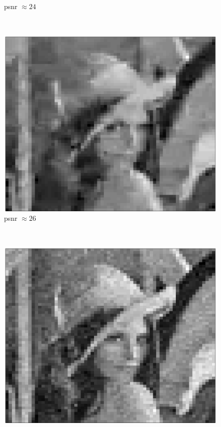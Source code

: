 \documentclass{article}
\begin{document}
\begin{figure}[h]
{\begin{minipage}[b]{0.25\textwidth}
				\small{psnr $\approx 24$}
				\label{psnr_24}
		\end{minipage}%
		~ %
		\begin{minipage}[b]{0.25\textwidth}
                \centering
				\includegraphics[width=\textwidth]{img/img_26_psnr}
				\small{psnr $\approx 26$}
				\label{psnr_26}
		\end{minipage}%
		~ %
		\begin{minipage}[b]{0.25\textwidth}
                \centering
				\includegraphics[width=\textwidth]{img/img_28_psnr}

\end{minipage}}
\end{figure}
\end{document}
